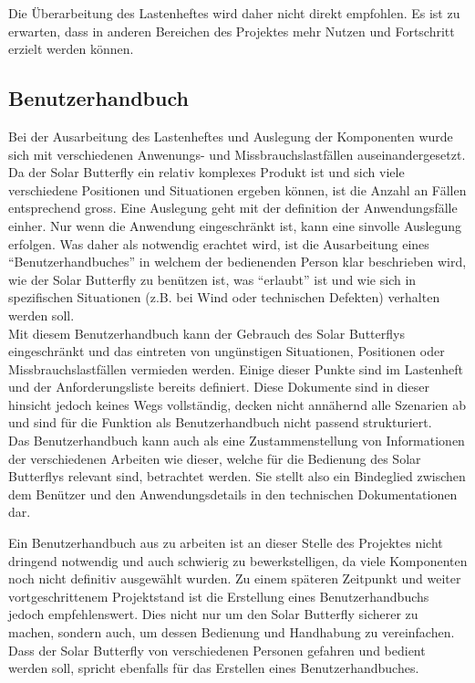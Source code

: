 Die Überarbeitung des Lastenheftes wird daher nicht direkt empfohlen. Es ist zu erwarten, dass in anderen Bereichen des Projektes mehr Nutzen und Fortschritt erzielt werden können.

\subsection{Benutzerhandbuch}
Bei der Ausarbeitung des Lastenheftes und Auslegung der Komponenten wurde sich mit verschiedenen Anwenungs- und Missbrauchslastfällen auseinandergesetzt. Da der Solar Butterfly ein relativ komplexes Produkt ist und sich viele verschiedene Positionen und Situationen ergeben können, ist die Anzahl an Fällen entsprechend gross. Eine Auslegung geht mit der definition der Anwendungsfälle einher. Nur wenn die Anwendung eingeschränkt ist, kann eine sinvolle Auslegung erfolgen.
Was daher als notwendig erachtet wird, ist die Ausarbeitung eines ``Benutzerhandbuches'' in welchem der bedienenden Person klar beschrieben wird, wie der Solar Butterfly zu benützen ist, was ``erlaubt'' ist und wie sich in spezifischen Situationen (z.B. bei Wind oder technischen Defekten) verhalten werden soll.\\
Mit diesem Benutzerhandbuch kann der Gebrauch des Solar Butterflys eingeschränkt und das eintreten von ungünstigen Situationen, Positionen oder Missbrauchslastfällen vermieden werden.
Einige dieser Punkte sind im Lastenheft und der Anforderungsliste bereits definiert. Diese Dokumente sind in dieser hinsicht jedoch keines Wegs vollständig, decken nicht annähernd alle Szenarien ab und sind für die Funktion als Benutzerhandbuch nicht passend strukturiert.\\
Das Benutzerhandbuch kann auch als eine Zustammenstellung von Informationen der verschiedenen Arbeiten wie dieser, welche für die Bedienung des Solar Butterflys relevant sind, betrachtet werden. Sie stellt also ein Bindeglied zwischen dem Benützer und den Anwendungsdetails in den technischen Dokumentationen dar.

Ein Benutzerhandbuch aus zu arbeiten ist an dieser Stelle des Projektes nicht dringend notwendig und auch schwierig zu bewerkstelligen, da viele Komponenten noch nicht definitiv ausgewählt wurden. Zu einem späteren Zeitpunkt und weiter vortgeschrittenem Projektstand ist die Erstellung eines Benutzerhandbuchs jedoch empfehlenswert. Dies nicht nur um den Solar Butterfly sicherer zu machen, sondern auch, um dessen Bedienung und Handhabung zu vereinfachen. Dass der Solar Butterfly von verschiedenen Personen gefahren und bedient werden soll, spricht ebenfalls für das Erstellen eines Benutzerhandbuches.

